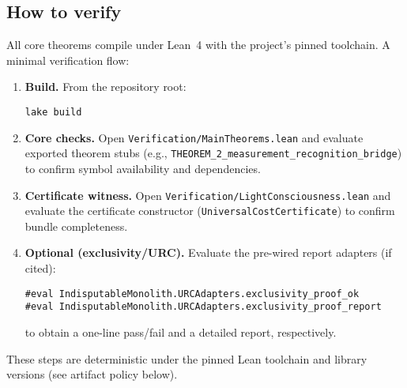 \documentclass[12pt,a4paper]{article}
\begin{document}
\subsection{How to verify}
All core theorems compile under Lean~4 with the project’s pinned toolchain. A minimal verification flow:
\begin{enumerate}
  \item \textbf{Build.} From the repository root:
\begin{verbatim}
lake build
\end{verbatim}
  \item \textbf{Core checks.} Open \texttt{Verification/MainTheorems.lean} and evaluate exported theorem stubs (e.g., \texttt{THEOREM\_2\_measurement\_recognition\_bridge}) to confirm symbol availability and dependencies.
  \item \textbf{Certificate witness.} Open \texttt{Verification/LightConsciousness.lean} and evaluate the certificate constructor (\texttt{UniversalCostCertificate}) to confirm bundle completeness.
  \item \textbf{Optional (exclusivity/URC).} Evaluate the pre-wired report adapters (if cited):
\begin{verbatim}
#eval IndisputableMonolith.URCAdapters.exclusivity_proof_ok
#eval IndisputableMonolith.URCAdapters.exclusivity_proof_report
\end{verbatim}
to obtain a one-line pass/fail and a detailed report, respectively.
\end{enumerate}
These steps are deterministic under the pinned Lean toolchain and library versions (see artifact policy below).
\end{document}

